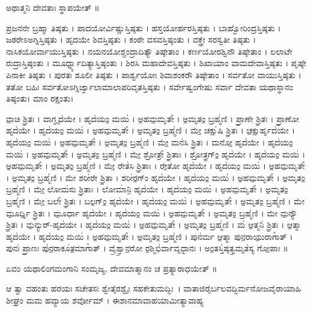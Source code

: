 ಅಥಾತ್ಮನಿ ದೇವತಾಃ ಸ್ಥಾಪಯೇತ್ ॥

ಪ್ರಜನನೇ ಬ್ರಹ್ಮಾ ತಿಷ್ಠತು । ಪಾದಯೋರ್ವಿಷ್ಣುಸ್ತಿಷ್ಠತು । ಹಸ್ತಯೋರ್ಹರಸ್ತಿಷ್ಠತು । ಬಾಹ್ವೋರಿಂದ್ರಸ್ತಿಷ್ಠತು । ಜಠರೇಽಅಗ್ನಿಸ್ತಿಷ್ಠತು । ಹೃದಯೇ ಶಿವಸ್ತಿಷ್ಠತು । ಕಂಠೇ ವಸವಸ್ತಿಷ್ಠಂತು । ವಕ್ತ್ರೇ ಸರಸ್ವತೀ ತಿಷ್ಠತು । ನಾಸಿಕಯೋರ್ವಾಯುಸ್ತಿಷ್ಠತು । ನಯನಯೋಶ್ಚಂದ್ರಾದಿತ್ಯೌ ತಿಷ್ಠೇತಾಂ । ಕರ್ಣಯೋರಶ್ವಿನೌ ತಿಷ್ಠೇತಾಂ । ಲಲಾಟೇ ರುದ್ರಾಸ್ತಿಷ್ಠಂತು । ಮೂರ್ಧ್ನ್ಯಾದಿತ್ಯಾಸ್ತಿಷ್ಠಂತು । ಶಿರಸಿ ಮಹಾದೇವಸ್ತಿಷ್ಠತು । ಶಿಖಾಯಾಂ ವಾಮದೇವಾಸ್ತಿಷ್ಠತು । ಪೃಷ್ಠೇ ಪಿನಾಕೀ ತಿಷ್ಠತು । ಪುರತಃ ಶೂಲೀ ತಿಷ್ಠತು । ಪಾರ್ಶ್ವಯೋಃ ಶಿವಾಶಂಕರೌ ತಿಷ್ಠೇತಾಂ । ಸರ್ವತೋ ವಾಯುಸ್ತಿಷ್ಠತು । ತತೋ ಬಹಿಃ ಸರ್ವತೋಽಗ್ನಿರ್ಜ್ವಾಲಾಮಾಲಾಪರಿವೃತಸ್ತಿಷ್ಠತು । ಸರ್ವೇಷ್ವಂಗೇಷು ಸರ್ವಾ ದೇವತಾ ಯಥಾಸ್ಥಾನಂ ತಿಷ್ಠಂತು। ಮಾಂ ರಕ್ಷಂತು।

 ವಾ॒ಚಿ ಶ್ರಿ॒ತಃ । ವಾಗ್ಘೃದ॑ಯೇ । ಹೃದ॑ಯಂ॒ ಮಯಿ॑ । ಅ॒ಹಮ॒ಮೃತೇ᳚ । ಅ॒ಮೃತಂ॒ ಬ್ರಹ್ಮ॑ಣಿ ।  ಪ್ರಾ॒ಣೇ ಶ್ರಿ॒ತಃ । ಪ್ರಾ॒ಣೋ ಹೃದ॑ಯೇ । ಹೃದ॑ಯಂ॒ ಮಯಿ॑ । ಅ॒ಹಮ॒ಮೃತೇ᳚ । ಅ॒ಮೃತಂ॒ ಬ್ರಹ್ಮ॑ಣಿ ।  ಮೇ॒ ಚಕ್ಷು॑ಷಿ ಶ್ರಿ॒ತಃ । ಚ॒ಕ್ಷುರ್ಹೃದ॑ಯೇ । ಹೃದ॑ಯಂ॒ ಮಯಿ॑ । ಅ॒ಹಮ॒ಮೃತೇ᳚ । ಅ॒ಮೃತಂ॒ ಬ್ರಹ್ಮ॑ಣಿ ।  ಮೇ॒ ಮನ॑ಸಿ ಶ್ರಿ॒ತಃ । ಮನೋ॒ ಹೃದ॑ಯೇ । ಹೃದ॑ಯಂ॒ ಮಯಿ॑ । ಅ॒ಹಮ॒ಮೃತೇ᳚ । ಅ॒ಮೃತಂ॒ ಬ್ರಹ್ಮ॑ಣಿ ।  ಮೇ॒ ಶ್ರೋತ್ರೇ᳚ ಶ್ರಿ॒ತಾಃ । ಶ್ರೋತ್ರ॒ಗ್ಂ॒ ಹೃದ॑ಯೇ । ಹೃದ॑ಯಂ॒ ಮಯಿ॑ । ಅ॒ಹಮ॒ಮೃತೇ᳚ । ಅ॒ಮೃತಂ॒ ಬ್ರಹ್ಮ॑ಣಿ ।  ಮೇ॒ ರೇತ॑ಸಿ ಶ್ರಿ॒ತಾಃ । ರೇ॒ತೋ ಹೃದ॑ಯೇ । ಹೃದ॑ಯಂ॒ ಮಯಿ॑ । ಅ॒ಹಮ॒ಮೃತೇ᳚ । ಅ॒ಮೃತಂ॒ ಬ್ರಹ್ಮ॑ಣಿ ।  ಮೇ ಶರೀ॑ರೇ ಶ್ರಿ॒ತಾ । ಶರೀ॑ರ॒ಗ್ಂ ಹೃದ॑ಯೇ । ಹೃದ॑ಯಂ॒ ಮಯಿ॑ । ಅ॒ಹಮ॒ಮೃತೇ᳚ । ಅ॒ಮೃತಂ॒ ಬ್ರಹ್ಮ॑ಣಿ ।  ಮೇ॒ ಲೋಮ॑ಸು ಶ್ರಿ॒ತಾಃ । ಲೋಮಾ॑ನಿ॒ ಹೃದ॑ಯೇ । ಹೃದ॑ಯಂ॒ ಮಯಿ॑ । ಅ॒ಹಮ॒ಮೃತೇ᳚ । ಅ॒ಮೃತಂ॒ ಬ್ರಹ್ಮ॑ಣಿ ।  ಮೇ॒ ಬಲೇ᳚ ಶ್ರಿ॒ತಃ । ಬಲ॒ಗ್ಂ॒ ಹೃದ॑ಯೇ । ಹೃದ॑ಯಂ॒ ಮಯಿ॑ । ಅ॒ಹಮ॒ಮೃತೇ᳚ । ಅ॒ಮೃತಂ॒ ಬ್ರಹ್ಮ॑ಣಿ ।  ಮೇ ಮೂ॒ರ್ಧ್ನಿ ಶ್ರಿ॒ತಃ । ಮೂ॒ರ್ಧಾ ಹೃದ॑ಯೇ । ಹೃದ॑ಯಂ॒ ಮಯಿ॑ । ಅ॒ಹಮ॒ಮೃತೇ᳚ । ಅ॒ಮೃತಂ॒ ಬ್ರಹ್ಮ॑ಣಿ ।  ಮೇ ಮ॒ನ್ಯೌ ಶ್ರಿ॒ತಃ । ಮ॒ನ್ಯುರ್-ಹೃದ॑ಯೇ । ಹೃದ॑ಯಂ॒ ಮಯಿ॑ । ಅ॒ಹಮ॒ಮೃತೇ᳚ । ಅ॒ಮೃತಂ॒ ಬ್ರಹ್ಮ॑ಣಿ ।  ಮ॑ ಆ॒ತ್ಮನಿ॑ ಶ್ರಿ॒ತಃ । ಆ॒ತ್ಮಾ ಹೃದ॑ಯೇ । ಹೃದ॑ಯಂ॒ ಮಯಿ॑ । ಅ॒ಹಮ॒ಮೃತೇ᳚ । ಅ॒ಮೃತಂ॒ ಬ್ರಹ್ಮ॑ಣಿ । ಪುನ॑ರ್ಮ ಆ॒ತ್ಮಾ ಪುನ॒ರಾಯು॒ರಾಗಾ᳚ತ್ । ಪುನಃ॑ ಪ್ರಾ॒ಣಃ ಪು॑ನ॒ರಾಕೂ॑ತ॒ಮಾಗಾ᳚ತ್ । ವೈ॒ಶ್ವಾ॒ನ॒ರೋ ರ॒ಶ್ಮಿಭಿ॑ರ್ವಾವೃಧಾ॒ನಃ । ಅಂ॒ತಸ್ತಿ॑ಷ್ಠತ್ವ॒ಮೃತ॑ಸ್ಯ ಗೋ॒ಪಾಃ ॥

ಏವಂ ಯಥಾಲಿಂಗಮಂಗಾನಿ ಸಂಮೃಜ್ಯ, ದೇವಮಾತ್ಮಾನಂ ಚ ಪ್ರತ್ಯಾರಾಧಯೇತ್ ॥\\

ಆ ತ್ವಾ ವಹಂತು ಹರಯಃ ಸಚೇತಸಃ ಶ್ವೇತೈರಶ್ವೈಃ  ಸಹಕೇತುಮದ್ಭಿಃ~। ವಾತಾಜಿರೈರ್ಬಲವದ್ಭಿರ್ಮನೋಜವೈರಾಯಾಹಿ ಶೀಘ್ರಂ ಮಮ ಹವ್ಯಾಯ ಶರ್ವೋಮ್ । ಈಶಾನಮಾವಾಹಯಾಮೀತ್ಯಾವಾಹ್ಯ\\

